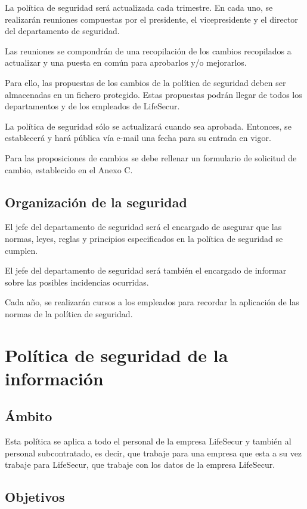 \documentclass[11pt,bibtotoc,noliststotoc,BCOR0mm]{scrbook}
\begin{document}
La política de seguridad será actualizada cada trimestre. En cada uno, se realizarán reuniones compuestas por el presidente, el vicepresidente y el director del departamento de seguridad.

Las reuniones se compondrán de una recopilación de los cambios recopilados a actualizar y una puesta en común para aprobarlos y/o mejorarlos.

Para ello, las propuestas de los cambios de la política de seguridad deben ser almacenadas en un fichero protegido. Estas propuestas podrán llegar de todos los departamentos y de los empleados de LifeSecur.

La política de seguridad sólo se actualizará cuando sea aprobada. Entonces, se establecerá y hará pública  vía e-mail una fecha para su entrada en vigor.

Para las proposiciones de cambios se debe rellenar un formulario de solicitud de cambio, establecido en el Anexo C.

\section{Organización de la seguridad}

El jefe del departamento de seguridad será el encargado de asegurar que las normas, leyes, reglas y principios especificados en la política de seguridad se cumplen.

El jefe del departamento de seguridad será también el encargado de informar sobre las posibles incidencias ocurridas.

Cada año, se realizarán cursos a los empleados para recordar la aplicación de las normas de la política de seguridad.

\chapter{Política de seguridad de la información}

\section{Ámbito}

Esta política se aplica a todo el personal de la empresa LifeSecur y también al personal subcontratado, es decir, que trabaje para una empresa que esta a su vez trabaje para LifeSecur, que trabaje con los datos de la empresa LifeSecur.


\section{Objetivos}
\end{document}
